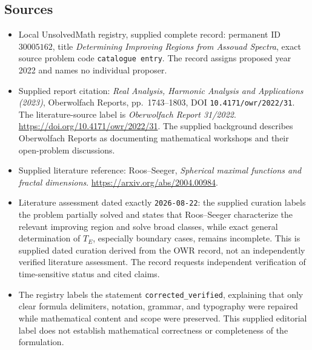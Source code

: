 \documentclass[11pt]{article}
\begin{document}
\subsection{Sources}
\begin{itemize}
\item Local UnsolvedMath registry, supplied complete record: permanent ID \(30005162\), title \emph{Determining Improving Regions from Assouad Spectra}, exact source problem code \texttt{catalogue entry}. The record assigns proposed year 2022 and names no individual proposer.
\item Supplied report citation: \emph{Real Analysis, Harmonic Analysis and Applications (2023)}, Oberwolfach Reports, pp.~1743--1803, DOI \texttt{10.4171/owr/2022/31}. The literature-source label is \emph{Oberwolfach Report 31/2022}. \url{https://doi.org/10.4171/owr/2022/31}. The supplied background describes Oberwolfach Reports as documenting mathematical workshops and their open-problem discussions.
\item Supplied literature reference: Roos--Seeger, \emph{Spherical maximal functions and fractal dimensions}. \url{https://arxiv.org/abs/2004.00984}.
\item Literature assessment dated exactly \texttt{2026-08-22}: the supplied curation labels the problem partially solved and states that Roos--Seeger characterize the relevant improving region and solve broad classes, while exact general determination of \(T_E\), especially boundary cases, remains incomplete. This is supplied dated curation derived from the OWR record, not an independently verified literature assessment. The record requests independent verification of time-sensitive status and cited claims.
\item The registry labels the statement \texttt{corrected\_verified}, explaining that only clear formula delimiters, notation, grammar, and typography were repaired while mathematical content and scope were preserved. This supplied editorial label does not establish mathematical correctness or completeness of the formulation.
\end{itemize}
\end{document}
